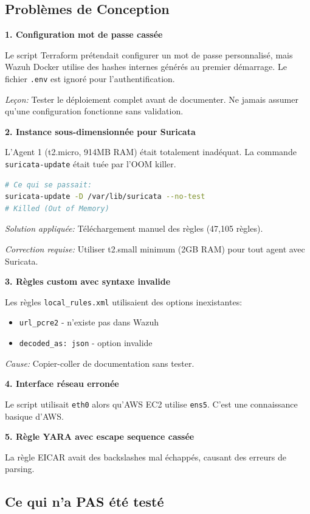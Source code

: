 \documentclass[12pt,a4paper]{article}
\begin{document}
\subsection{Problèmes de Conception}

\textbf{1. Configuration mot de passe cassée}

Le script Terraform prétendait configurer un mot de passe personnalisé, mais Wazuh Docker utilise des hashes internes générés au premier démarrage. Le fichier \texttt{.env} est ignoré pour l'authentification.

\textit{Leçon:} Tester le déploiement complet avant de documenter. Ne jamais assumer qu'une configuration fonctionne sans validation.

\textbf{2. Instance sous-dimensionnée pour Suricata}

L'Agent 1 (t2.micro, 914MB RAM) était totalement inadéquat. La commande \texttt{suricata-update} était tuée par l'OOM killer.

\begin{lstlisting}[language=bash]
# Ce qui se passait:
suricata-update -D /var/lib/suricata --no-test
# Killed (Out of Memory)
\end{lstlisting}

\textit{Solution appliquée:} Téléchargement manuel des règles (47,105 règles).

\textit{Correction requise:} Utiliser t2.small minimum (2GB RAM) pour tout agent avec Suricata.

\textbf{3. Règles custom avec syntaxe invalide}

Les règles \texttt{local\_rules.xml} utilisaient des options inexistantes:
\begin{itemize}
    \item \texttt{url\_pcre2} - n'existe pas dans Wazuh
    \item \texttt{decoded\_as: json} - option invalide
\end{itemize}

\textit{Cause:} Copier-coller de documentation sans tester.

\textbf{4. Interface réseau erronée}

Le script utilisait \texttt{eth0} alors qu'AWS EC2 utilise \texttt{ens5}. C'est une connaissance basique d'AWS.

\textbf{5. Règle YARA avec escape sequence cassée}

La règle EICAR avait des backslashes mal échappés, causant des erreurs de parsing.

\subsection{Ce qui n'a PAS été testé}
\end{document}
